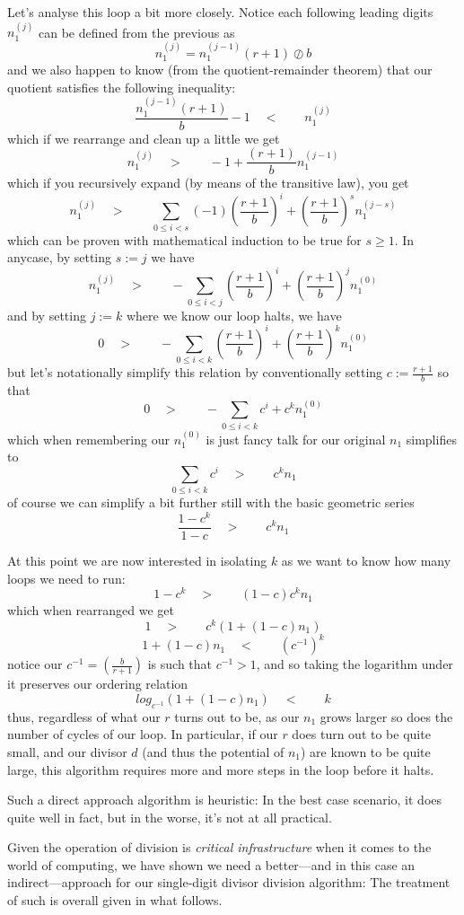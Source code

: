 \documentclass[twoside]{article}
\begin{document}
Let's analyse this loop a bit more closely. Notice each following
leading digits $ n_1^{(j)} $ can be defined from the previous as
$$ n_1^{(j)}=n_1^{(j-1)}(r+1)\oslash b $$
and we also happen to know (from the quotient-remainder theorem) that our quotient satisfies the following inequality:
$$ \frac{n_1^{(j-1)}(r+1)}{b}-1\quad <\qquad n_1^{(j)} $$
which if we rearrange and clean up a little we get
$$ n_1^{(j)}\quad >\qquad -1+\frac{(r+1)}{b}n_1^{(j-1)} $$
which if you recursively expand (by means of the transitive law), you get
$$ n_1^{(j)}\quad >\qquad \sum_{0\le i < s}(-1)\left(\frac{r+1}{b}\right)^i+\left(\frac{r+1}{b}\right)^s n_1^{(j-s)} $$
which can be proven with mathematical induction to be true for $ s\ge 1 $. In anycase, by setting $ s:=j $ we have
$$ n_1^{(j)}\quad >\qquad -\sum_{0\le i < j}\left(\frac{r+1}{b}\right)^i+\left(\frac{r+1}{b}\right)^j n_1^{(0)} $$
and by setting $ j:=k $ where we know our loop halts, we have
$$ 0\quad >\qquad -\sum_{0\le i < k}\left(\frac{r+1}{b}\right)^i+\left(\frac{r+1}{b}\right)^k n_1^{(0)} $$
but let's notationally simplify this relation by conventionally setting $ c:=\frac{r+1}{b} $ so that
$$ 0\quad >\qquad -\sum_{0\le i < k}c^i+c^k n_1^{(0)} $$
which when remembering our $ n_1^{(0)} $ is just fancy talk for our original $ n_1 $ simplifies to
$$ \sum_{0\le i < k}c^i\quad >\qquad c^k n_1 $$
of course we can simplify a bit further still with the basic geometric series
$$ \frac{1-c^k}{1-c}\quad >\qquad c^k n_1 $$

At this point we are now interested in isolating $ k $ as we want to know how many loops we need to run:
$$ 1-c^k\quad >\qquad (1-c)c^k n_1 $$
which when rearranged we get
$$ 1\quad >\qquad c^k(1+(1-c)n_1) $$
$$ 1+(1-c)n_1\quad <\qquad (c^{-1})^k $$
notice our $ c^{-1}=\left(\frac{b}{r+1}\right) $ is such that $ c^{-1} > 1 $,
and so taking the logarithm under it preserves our ordering relation
$$ log_{c^{-1}}(1+(1-c)n_1)\quad <\qquad k $$
thus, regardless of what our $ r $ turns out to be, as our $ n_1 $ grows larger so does the number of cycles of our loop.
In particular, if our $ r $ does turn out to be quite small, and our divisor $ d $ (and thus the potential of $ n_1 $)
are known to be quite large, this algorithm requires more and more steps in the loop before it halts.

Such a direct approach algorithm is heuristic: In the best case scenario, it does quite well in fact, but in the worse,
it's not at all practical.

Given the operation of division is \emph{critical infrastructure} when it comes to the world of computing, we have shown
we need a better---and in this case an indirect---approach for our single-digit divisor division algorithm:
The treatment of such is overall given in what follows.
\end{document}
